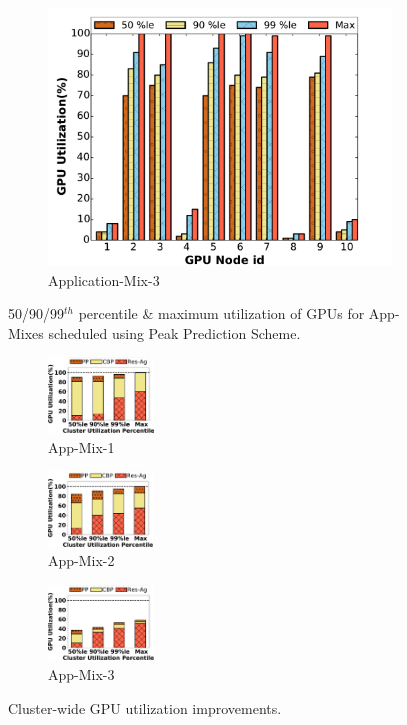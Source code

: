 \begin{figure}[!tbp]
\begin{subfigure}[b]{.33\textwidth}
  \includegraphics[width=1.1\linewidth]{results/app3-peak.pdf}
  \caption{Application-Mix-3}
  \label{fig:app3-pcp}
\end{subfigure}
\vspace{-6mm}
\caption{50/90/99$^{th}$ percentile \& maximum utilization of GPUs for App-Mixes scheduled using Peak Prediction Scheme.}
\label{fig:pcp}
\end{figure}

\begin{figure}[tbp!]
\begin{subfigure}[b]{.15\textwidth}
  \centering
  \includegraphics[width=.99\linewidth,height=2cm]{results/app1-avg.pdf}
  \caption{App-Mix-1}
  \label{fig:util1}
\end{subfigure}
\begin{subfigure}[b]{.15\textwidth}
  \centering
  \includegraphics[width=.99\linewidth,height=2cm]{results/app2-avg.pdf}
  \caption{App-Mix-2}
  \label{fig:util2}
\end{subfigure}
\begin{subfigure}[b]{.15\textwidth}
  \centering
  \includegraphics[width=.99\linewidth,height=2cm]{results/app3-avg.pdf}
  \caption{App-Mix-3}
  \label{fig:util3}
\end{subfigure}
\vspace{-3mm}
\caption{Cluster-wide GPU utilization improvements.}
\label{fig:util}
\vspace{-2mm}
\end{figure}

